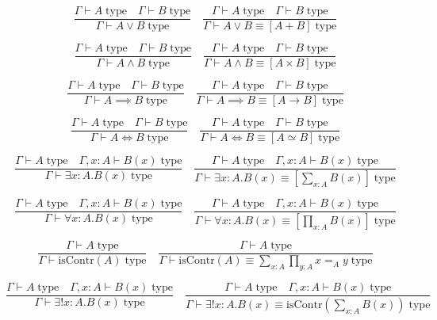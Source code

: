 \documentclass{book}
\begin{document}
$$\frac{\Gamma \vdash A \; \mathrm{type} \quad \Gamma \vdash B \; \mathrm{type}}{\Gamma \vdash A \vee B \; \mathrm{type}} \quad \frac{\Gamma \vdash A \; \mathrm{type} \quad \Gamma \vdash B \; \mathrm{type}}{\Gamma \vdash A \vee B \equiv [A + B] \; \mathrm{type}}$$

$$\frac{\Gamma \vdash A \; \mathrm{type} \quad \Gamma \vdash B \; \mathrm{type}}{\Gamma \vdash A \wedge B \; \mathrm{type}} \quad \frac{\Gamma \vdash A \; \mathrm{type} \quad \Gamma \vdash B \; \mathrm{type}}{\Gamma \vdash A \wedge B \equiv [A \times B] \; \mathrm{type}}$$

$$\frac{\Gamma \vdash A \; \mathrm{type} \quad \Gamma \vdash B \; \mathrm{type}}{\Gamma \vdash A \implies B \; \mathrm{type}} \quad \frac{\Gamma \vdash A \; \mathrm{type} \quad \Gamma \vdash B \; \mathrm{type}}{\Gamma \vdash A \implies B \equiv [A \to B] \; \mathrm{type}}$$

$$\frac{\Gamma \vdash A \; \mathrm{type} \quad \Gamma \vdash B \; \mathrm{type}}{\Gamma \vdash A \iff B \; \mathrm{type}} \quad \frac{\Gamma \vdash A \; \mathrm{type} \quad \Gamma \vdash B \; \mathrm{type}}{\Gamma \vdash A \iff B \equiv [A \simeq B] \; \mathrm{type}}$$

$$\frac{\Gamma \vdash A \; \mathrm{type} \quad \Gamma, x:A \vdash B(x) \; \mathrm{type}}{\Gamma \vdash \exists x:A.B(x) \; \mathrm{type}} \quad \frac{\Gamma \vdash A \; \mathrm{type} \quad \Gamma, x:A \vdash B(x) \; \mathrm{type}}{\Gamma \vdash \exists x:A.B(x) \equiv \left[\sum_{x:A} B(x)\right] \; \mathrm{type}}$$

$$\frac{\Gamma \vdash A \; \mathrm{type} \quad \Gamma, x:A \vdash B(x) \; \mathrm{type}}{\Gamma \vdash \forall x:A.B(x) \; \mathrm{type}} \quad \frac{\Gamma \vdash A \; \mathrm{type} \quad \Gamma, x:A \vdash B(x) \; \mathrm{type}}{\Gamma \vdash \forall x:A.B(x) \equiv \left[\prod_{x:A} B(x)\right] \; \mathrm{type}}$$

$$\frac{\Gamma \vdash A \; \mathrm{type}}{\Gamma \vdash \mathrm{isContr}(A) \; \mathrm{type}} \quad \frac{\Gamma \vdash A \; \mathrm{type}}{\Gamma \vdash \mathrm{isContr}(A) \equiv \sum_{x:A} \prod_{y:A} x =_A y \; \mathrm{type}}$$

$$\frac{\Gamma \vdash A \; \mathrm{type} \quad \Gamma, x:A \vdash B(x) \; \mathrm{type}}{\Gamma \vdash \exists!x:A.B(x) \; \mathrm{type}} \quad \frac{\Gamma \vdash A \; \mathrm{type} \quad \Gamma, x:A \vdash B(x) \; \mathrm{type}}{\Gamma \vdash \exists!x:A.B(x) \equiv \mathrm{isContr}\left(\sum_{x:A} B(x)\right) \; \mathrm{type}}$$
\end{document}
